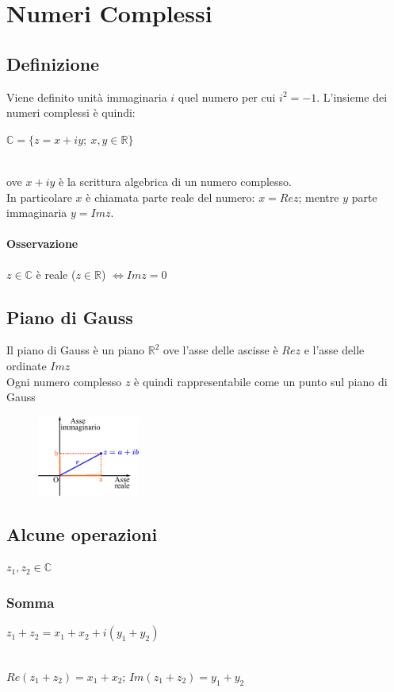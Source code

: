 \chapter{Numeri Complessi}
\section{Definizione}
Viene definito unità immaginaria $i$ quel numero per cui $i^2 = -1$.
L'insieme dei numeri complessi è quindi:\\
\begin{Large}
$\mathbb{C} = \{z = x + iy;\ x,y \in \mathbb{R}\}$
\end{Large}\\
ove $x + iy$ è la scrittura algebrica di un numero complesso.\\
In particolare $x$ è chiamata parte reale del numero: $x = Rez$; mentre $y$ parte immaginaria $y = Imz$.\\
\subsubsection{Osservazione}
$z \in \mathbb{C}$ è reale ($z \in \mathbb{R}$) $\iff Imz = 0$

\section{Piano di Gauss}
Il piano di Gauss è un piano $\mathbb{R}^2$ ove l'asse delle ascisse è $Rez$ e l'asse delle ordinate $Imz$\\
Ogni numero complesso $z$ è quindi rappresentabile come un punto sul piano di Gauss\\
\begin{figure}[htbp]
	\centering
	\includegraphics[width=0.3\textwidth]{images/piano_gauss.png}
\end{figure}

\section{Alcune operazioni}
$z_1,z_2 \in \mathbb{C}$
\subsection{Somma}
\begin{Large}
$z_1+z_2 = x_1+x_2+i(y_1+y_2)$ 
\end{Large}\\
$Re(z_1+z_2) = x_1+x_2$;   $Im(z_1+z_2) = y_1+y_2$
